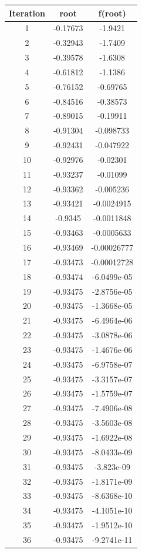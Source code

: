 \documentclass[12pt]{report}
\begin{document}
\begin{center}
  \begin{tabular}{| c  c c |}
\hline
Iteration & root         & f(root) \\
\hline
1   &  -0.17673         &-1.9421 \\
\hline
2   &  -0.32943         &-1.7409 \\
\hline
3    & -0.39578         &-1.6308 \\
\hline
4     &-0.61812         &-1.1386 \\
\hline
5     &-0.76152        &-0.69765 \\
\hline
6     &-0.84516        &-0.38573 \\
\hline
7     &-0.89015        &-0.19911 \\
\hline
8     &-0.91304       &-0.098733 \\
\hline
9    & -0.92431       &-0.047922 \\
\hline
10    & -0.92976       & -0.02301 \\
\hline
11     &-0.93237       & -0.01099 \\
\hline
12     &-0.93362       &-0.005236 \\
\hline
13     &-0.93421      &-0.0024915 \\
\hline
14      &-0.9345      &-0.0011848 \\
\hline
15     &-0.93463      &-0.0005633 \\
\hline
16     &-0.93469     &-0.00026777 \\
\hline
17     &-0.93473     &-0.00012728 \\
\hline
18     &-0.93474     &-6.0499e-05 \\
\hline
19     &-0.93475     &-2.8756e-05 \\
\hline
20     &-0.93475    & -1.3668e-05 \\
\hline
21     &-0.93475    & -6.4964e-06 \\
\hline
22     &-0.93475    & -3.0878e-06 \\
\hline
23     &-0.93475    & -1.4676e-06 \\
\hline
24     &-0.93475    & -6.9758e-07 \\
\hline
25     &-0.93475    & -3.3157e-07 \\
\hline
26     &-0.93475    & -1.5759e-07 \\
\hline
27     &-0.93475    & -7.4906e-08 \\
\hline
28     &-0.93475    & -3.5603e-08 \\
\hline
29     &-0.93475    & -1.6922e-08 \\
\hline
30     &-0.93475    & -8.0433e-09 \\
\hline
31     &-0.93475    &  -3.823e-09 \\
\hline
32     &-0.93475    & -1.8171e-09 \\
\hline
33     &-0.93475    & -8.6368e-10 \\
\hline
34     &-0.93475    & -4.1051e-10 \\
\hline
35     &-0.93475    & -1.9512e-10 \\
\hline
36     &-0.93475    & -9.2741e-11 \\
\hline
\end{tabular}
\end{center}
\end{document}
